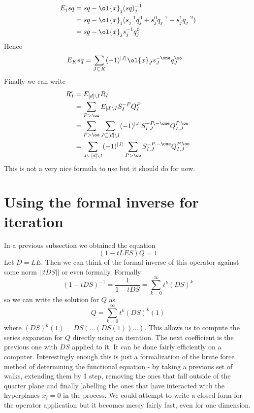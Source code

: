 \begin{align*}
	E_j sq &= sq - \ol{x}_j(sq)_j^{-1} \\ 
	&= sq - \ol{x}_j(s_j^{-1}q_j^0+s_j^{0}q_j^{-1}+s_j^{1}q_j^{-2})\\
	& = sq - \ol{x}_js_j^{-1}q_j^0
\end{align*}
Hence
\begin{align*}
	E_{K} sq &= \sum_{J\subseteq K} (-1)^{|J|}\ol{x}_J s_J^{-\one} q_J^\oo
\end{align*}
Finally we can write
\begin{align*}
	R_I' &= E_{[d]\backslash I} R_I \\
	& = \sum_{P > \oo} E_{[d]\backslash I}S_I^{-P}Q_I^P\\
	& = \sum_{P > \oo} \sum_{J \subseteq [d]\backslash I} (-1)^{|J|} S_{I,J}^{-P,-\one}Q_{I,J}^{P,\oo}\\
	& = \sum_{J \subseteq [d]\backslash I}(-1)^{|J|}\sum_{P > \oo} S_{I,J}^{-P,-\one}Q_{I,J}^{P,\oo}\\
\end{align*}
This is not a very nice formula to use but it should do for now.
\section{Using the formal inverse for iteration}
In a previous subsection we obtained the equation
\[
	(1-tLES)Q = 1
\]
Let $D = LE$. Then we can think of the formal inverse of this operator against some norm $||tDS||$ or even formally. Formally
\[
	(1-tDS)^{-1} = \frac{1}{1-tDS} = \sum_{k=0}^{\infty}t^k(DS)^k
\]
so we can write the solution for $Q$ as
\[
Q = \sum_{k=0}^{\infty}t^k (DS)^k(1)
\]
where $(DS)^k(1) = DS(\ldots (DS(1))\ldots)$. This allows us to compute the series expansion for $Q$ directly using an iteration. The next coefficient is the previous one with $DS$ applied to it. It can be done fairly efficiently on a computer. Interestingly enough this is just a formalization of the brute force method of determining the functional equation - by taking a previous set of walks, extending them by 1 step, removing the ones that fall outside of the quarter plane and finally labelling the ones that have interacted with the hyperplanes $x_i = 0$ in the process. We could attempt to write a closed form for the operator application but it becomes messy fairly fast, even for one dimension.

\endinput
